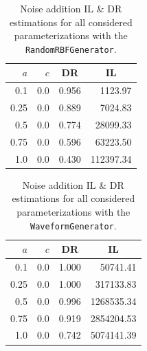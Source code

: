 \begin{minipage}[t]{0.5\textwidth}
	\begin{flushleft}
	\begin{table}[H]
		\centering
		\begin{tabular}{@{}rrrr@{}}
			\toprule
			$a$ & $c$ & \multicolumn{1}{c}{DR} & \multicolumn{1}{c}{IL} \\ \midrule
			0.1 & 0.0 & 0.956	& 1123.97 \\
			0.25 & 0.0 & 0.889 & 7024.83 \\
			0.5 & 0.0 & 0.774	& 28099.33 \\
			0.75 & 0.0 & 0.596 & 63223.50 \\
			1.0 & 0.0 & 0.430 & 112397.34 \\ \bottomrule
		\end{tabular}
		\caption[Noise addition DR \& IL estimations (\texttt{RandomRBFGenerator}).]{Noise addition IL \& DR estimations for all considered parameterizations with the \texttt{RandomRBFGenerator}.}
		\label{table:results-rbf-noise-addition}
	\end{table}
	\end{flushleft}
\end{minipage}
\begin{minipage}[t]{0.5\textwidth}
	\begin{flushright}
	\begin{table}[H]
		\centering
		\begin{tabular}{@{}rrrr@{}}
			\toprule
			$a$ & $c$ & \multicolumn{1}{c}{DR} & \multicolumn{1}{c}{IL} \\ \midrule
			0.1  & 0.0 & 1.000 & 50741.41   \\
			0.25 & 0.0 & 1.000 & 317133.83  \\
			0.5  & 0.0 & 0.996 & 1268535.34 \\
			0.75 & 0.0 & 0.919 & 2854204.53 \\
			1.0  & 0.0 & 0.742 & 5074141.39 \\ \bottomrule
		\end{tabular}
		\caption[Noise addition DR \& IL estimations (\texttt{WaveformGenerator}).]{Noise addition IL \& DR estimations for all considered parameterizations with the \texttt{WaveformGenerator}.}
		\label{table:results-wave-noise-addition}
	\end{table}
	\end{flushright}
\end{minipage}

